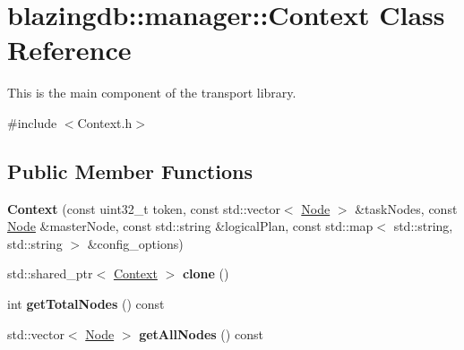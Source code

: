 \hypertarget{classblazingdb_1_1manager_1_1Context}{}\section{blazingdb\+:\+:manager\+:\+:Context Class Reference}
\label{classblazingdb_1_1manager_1_1Context}


This is the main component of the transport library.  




{\ttfamily \#include $<$Context.\+h$>$}

\subsection*{Public Member Functions}
\begin{DoxyCompactItemize}
\item 
\mbox{\label{classblazingdb_1_1manager_1_1Context_a06497a0c2a975edaefeb70077bed281c}} 
{\bfseries Context} (const uint32\+\_\+t token, const std\+::vector$<$ \hyperlink{classblazingdb_1_1transport_1_1Node}{Node} $>$ \&task\+Nodes, const \hyperlink{classblazingdb_1_1transport_1_1Node}{Node} \&master\+Node, const std\+::string \&logical\+Plan, const std\+::map$<$ std\+::string, std\+::string $>$ \&config\+\_\+options)
\item 
\mbox{\label{classblazingdb_1_1manager_1_1Context_a2e7dc296d717126eb032ab3f55742531}} 
std\+::shared\+\_\+ptr$<$ \hyperlink{classblazingdb_1_1manager_1_1Context}{Context} $>$ {\bfseries clone} ()
\item 
\mbox{\label{classblazingdb_1_1manager_1_1Context_a19e76e2eec88f05dbbb4dc54600c2ea4}} 
int {\bfseries get\+Total\+Nodes} () const
\item 
\mbox{\label{classblazingdb_1_1manager_1_1Context_a1107a1de655b5904b4bff8f4db648fa6}} 
std\+::vector$<$ \hyperlink{classblazingdb_1_1transport_1_1Node}{Node} $>$ {\bfseries get\+All\+Nodes} () const
\item 
\mbox{\label{classblazingdb_1_1manager_1_1Context_a8145e32076548759fa9163dd1fe13ccf}} 

\end{DoxyCompactItemize}
